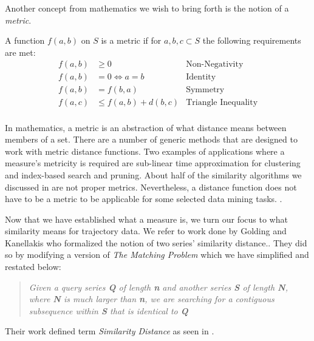 Another concept from mathematics we wish to bring forth is the notion of a \textit{metric}\cite{30-Metric}. 

\medskip

\begin{definition} %
\label{def:metric}  
A function $f(a, b)$ on $S$ is a metric if for $a, b, c \subset S$ the following requirements are met:
\begin{align*}
 f(a, b) &\geqslant 0 & \text{Non-Negativity} \\ 
 f(a, b) &= 0 \Leftrightarrow  a=b &\text{Identity}  \\
 f(a, b) &= f (b,a) &\text{Symmetry}  \\
 f(a, c) &\leqslant f(a, b) + d(b, c)  &\text{Triangle Inequality}  \\
\end{align*}
\end{definition}

In mathematics, a metric is an abstraction of what distance means between members of a set. 
There are a number of generic methods that are designed to work with metric distance functions. 
Two examples of applications where a measure's metricity is required are sub-linear time approximation for clustering and index-based search and pruning\cite{85-VehicleTrajectory,54-IndexdrivenSimilarity,87-SublinearTime}.  
About half of the similarity algorithms we discussed in  are not proper metrics. 
Nevertheless, a distance function does not have to be a metric to be applicable for some selected data mining tasks. \cite{47-ClassificationNonmetric}. 


Now that we have established what a measure is, we turn our focus to what similarity means for trajectory data. 
We refer to work done by Golding and Kanellakis who formalized the notion of two series' similarity distance.\cite{16-SimilarityQueries}. 
They did so by modifying a version of \textit{The Matching Problem} which we have simplified and restated below:

\begin{quote}
\textit{Given a query series \textbf{Q} of length  \textbf{n} and another series \textbf{S} of length  \textbf{N}, where \textbf{N} is much larger than \textbf{n}, we are searching for a contiguous subsequence within \textbf{S} that is identical to  \textbf{Q}}
\end{quote}

Their work defined term \textit{Similarity Distance} as seen in . 

